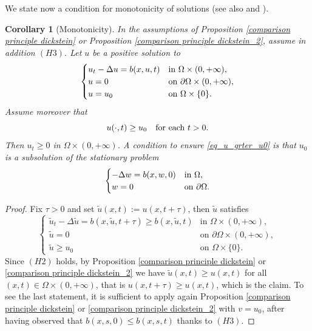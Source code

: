 \documentclass[11pt, reqno]{amsart}
\newtheorem{corollary}[lemma]{Corollary}
\theoremstyle{definition}
\numberwithin{equation}{section}
\begin{document}
We state now a condition for monotonicity of solutions (see also \cite[Proposition 6.12]{CazenaveDicksteinEscobedo} and \cite[Lemma 4.1, pag 199]{pao}).
\begin{corollary}[Monotonicity]
\label{corol_monotonicity}
In the assumptions of Proposition \ref{comparison principle dickstein} or Proposition \ref{comparison principle dickstein_2}, assume in addition \hyperlink{H3}{\( (H3) \)}.
Let $u$ be a positive solution to 
	\begin{equation*}
		\begin{cases}
			u_t-\Delta u = b(x,u,t)&\hbox{in } \Omega\times(0,+\infty),\\
			u=0 &\hbox{on } \partial \Omega\times(0,+\infty),\\
			u=u_0&\hbox{on } \Omega \times \{0\}.
		\end{cases}
	\end{equation*}
	Assume moreover that 
\begin{equation}\label{eq_u_grter_u0}
u(\cdot, t) \geq u_0 \quad \hbox{for each $t>0$}.
\end{equation}
Then $u_t \geq 0$ in $\Omega\times (0,+\infty)$. 
A condition to ensure \eqref{eq_u_grter_u0} is that $u_0$ is a subsolution of the stationary problem
	\begin{equation*}
	\begin{cases}
		-\Delta w = b(x,w,0)&\hbox{in } \Omega,\\
		w=0 &\hbox{on } \partial \Omega.\\
	\end{cases}
\end{equation*}
\end{corollary}
\begin{proof}
Fix $\tau>0$ and set $\tilde{u}(x,t):=u(x,t+\tau)$, then $\tilde{u}$ satisfies 
	\[	\begin{cases}
		\tilde{u}_t -\Delta \tilde{u} =b(x,\tilde{u},t+\tau) \geq b(x,\tilde{u}, t) &\text{in }\Omega\times (0,+\infty),\\
		\tilde{u}=0 & \text{on }\partial \Omega\times (0,+\infty),\\ 
		\tilde{u} \geq u_0 & \text{on } \Omega \times \{0\}.
	\end{cases}\]	
	Since \hyperlink{H2}{\( (H2) \)} holds, by Proposition \ref{comparison principle dickstein} or \ref{comparison principle dickstein_2} we have $\tilde{u}(x,t)\geq u(x,t)$ for all $(x,t)\in\Omega\times(0,+\infty)$, that is $u(x,t+\tau)\geq u(x,t)$, which is the claim.
To see the last statement, it is sufficient to apply again Proposition \ref{comparison principle dickstein}  or \ref{comparison principle dickstein_2} with $v=u_0$, after having observed that $b(x,s,0)\leq b(x,s,t)$ thanks to \hyperlink{H3}{\( (H3) \)}.
\end{proof}
\end{document}

